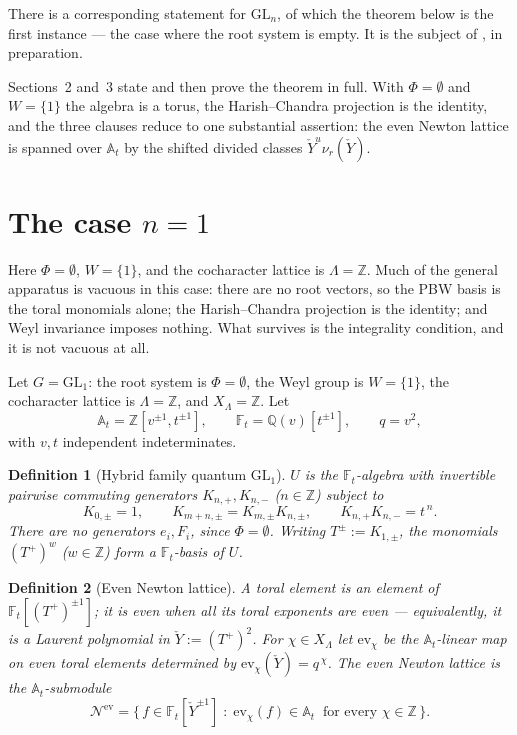 \documentclass[11pt]{article}
\newtheorem{definition}{Definition}
\newcommand{\At}{\mathbb{A}_t}
\newcommand{\Ft}{\mathbb{F}_t}
\newcommand{\Nev}{\mathcal N^{\mathrm{ev}}}
\newcommand{\Yc}{\check Y}
\begin{document}
\medskip\noindent
There is a corresponding statement for $\mathrm{GL}_n$, of which the theorem below is the first instance ---
the case where the root system is empty. It is the subject of \cite{HauselLowit}, in preparation.

\medskip\noindent
Sections~2 and~3 state and then prove the theorem in full. With $\Phi=\emptyset$ and
$W=\{1\}$ the algebra is a torus, the Harish--Chandra projection is the identity, and the three
clauses reduce to one substantial assertion: the even Newton lattice is spanned over $\At$ by the
shifted divided classes $\Yc^{u}\nu_r(\Yc)$.



\section{The case $n=1$}

\noindent
Here $\Phi=\emptyset$, $W=\{1\}$, and the cocharacter lattice is $\Lambda=\mathbb Z$. Much of the
general apparatus is vacuous in this case: there are no root vectors, so the PBW basis is the toral
monomials alone; the Harish--Chandra projection is the identity; and Weyl invariance imposes
nothing. What survives is the integrality condition, and it is not vacuous at all.

Let $G=\mathrm{GL}_1$: the root system is $\Phi=\emptyset$, the Weyl group is
$W=\{1\}$, the cocharacter lattice is $\Lambda=\mathbb Z$, and
$X_\Lambda=\mathbb Z$. Let
\[
  \At=\mathbb Z[v^{\pm1},t^{\pm1}],\qquad
  \Ft=\mathbb Q(v)[t^{\pm1}],\qquad
  q=v^{2},
\]
with $v,t$ independent indeterminates.

\begin{definition}[Hybrid family quantum $\mathrm{GL}_1$]\label{def:U}
$U$ is the $\Ft$-algebra with invertible pairwise commuting generators
$K_{n,+},K_{n,-}$ ($n\in\mathbb Z$) subject to
\[
  K_{0,\pm}=1,\qquad
  K_{m+n,\pm}=K_{m,\pm}K_{n,\pm},\qquad
  K_{n,+}K_{n,-}=t^{\,n}.
\]
There are no generators $e_i,F_i$, since $\Phi=\emptyset$. Writing
$T^{\pm}:=K_{1,\pm}$, the monomials $(T^{+})^{w}$ ($w\in\mathbb Z$) form a
$\Ft$-basis of $U$.
\end{definition}

\begin{definition}[Even Newton lattice]\label{def:nev}
A \emph{toral} element is an element of $\Ft[(T^{+})^{\pm1}]$; it is \emph{even}
when all its toral exponents are even --- equivalently, it is a Laurent
polynomial in $\Yc:=(T^{+})^{2}$. For $\chi\in X_\Lambda$ let
$\mathrm{ev}_\chi$ be the $\At$-linear map on even toral elements determined by
$\mathrm{ev}_\chi(\Yc)=q^{\,\chi}$. The \emph{even Newton lattice} is the
$\At$-submodule
\[
  \Nev=\bigl\{\,f\in\Ft[\Yc^{\pm1}]\;:\;
  \mathrm{ev}_\chi(f)\in\At\ \text{ for every }\chi\in\mathbb Z\,\bigr\}.
\]
\end{definition}
\end{document}
